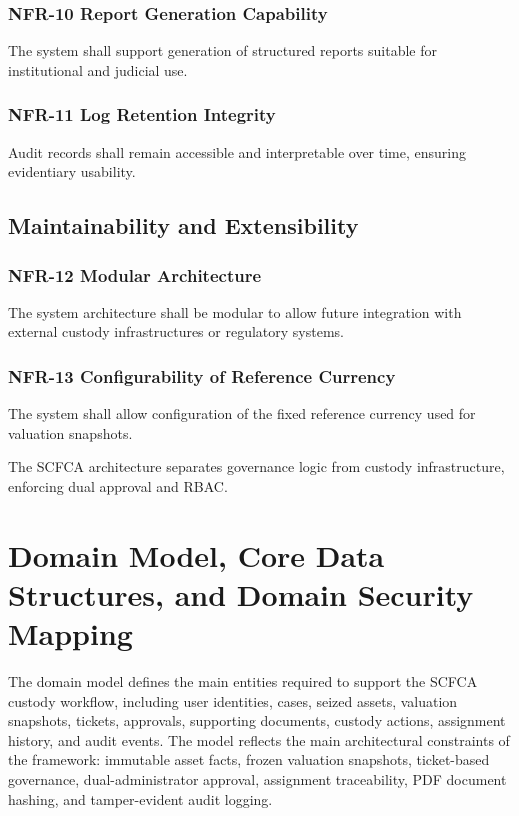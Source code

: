 \documentclass[12pt,a4paper]{report}
\begin{document}
\subsubsection{NFR-10 Report Generation Capability}

The system shall support generation of structured reports suitable for institutional and judicial use.

\subsubsection{NFR-11 Log Retention Integrity}

Audit records shall remain accessible and interpretable over time, ensuring evidentiary usability.

\subsection{Maintainability and Extensibility}

\subsubsection{NFR-12 Modular Architecture}

The system architecture shall be modular to allow future integration with external custody infrastructures or regulatory systems.

\subsubsection{NFR-13 Configurability of Reference Currency}

The system shall allow configuration of the fixed reference currency used for valuation snapshots.

The SCFCA architecture separates governance logic from
custody infrastructure, enforcing dual approval and RBAC.


\section{Domain Model, Core Data Structures, and Domain Security Mapping}

The domain model defines the main entities required to support the SCFCA custody
workflow, including user identities, cases, seized assets, valuation snapshots, tickets,
approvals, supporting documents, custody actions, assignment history, and audit events.
The model reflects the main architectural constraints of the framework: immutable asset
facts, frozen valuation snapshots, ticket-based governance, dual-administrator approval,
assignment traceability, PDF document hashing, and tamper-evident audit logging.
\end{document}
